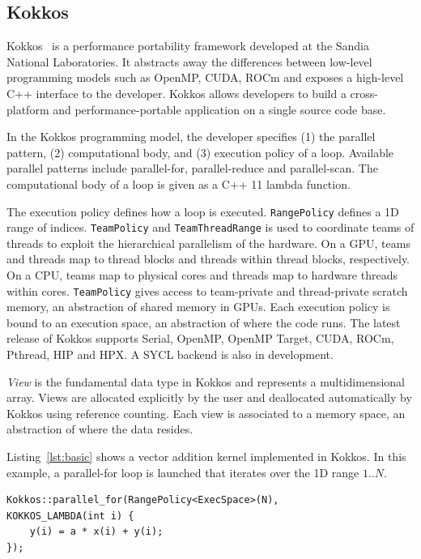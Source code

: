 \documentclass[conference]{IEEEtran}
\begin{document}
\subsection{Kokkos}

Kokkos~\cite{Edwards2014} is a performance portability framework developed at
the Sandia National Laboratories. It abstracts away the differences between
low-level programming models such as OpenMP, CUDA, ROCm and exposes a
high-level C++ interface to the developer. Kokkos allows developers to build a
cross-platform and performance-portable application on a single source code
base.

In the Kokkos programming model, the developer specifies (1) the parallel
pattern, (2) computational body, and (3) execution policy of a loop. Available
parallel patterns include parallel-for, parallel-reduce and parallel-scan. The
computational body of a loop is given as a C++ 11 lambda function.

The execution policy defines how a loop is executed. \texttt{RangePolicy}
defines a 1D range of indices. \texttt{TeamPolicy} and \texttt{TeamThreadRange}
is used to coordinate teams of threads to exploit the hierarchical parallelism
of the hardware. On a GPU, teams and threads map to thread blocks and threads
within thread blocks, respectively. On a CPU, teams map to physical cores and
threads map to hardware threads within cores. \texttt{TeamPolicy} gives access
to team-private and thread-private scratch memory, an abstraction of shared
memory in GPUs. Each execution policy is bound to an execution space, an
abstraction of where the code runs. The latest release of Kokkos supports
Serial, OpenMP, OpenMP Target, CUDA, ROCm, Pthread, HIP and HPX\@. A SYCL
backend is also in development.

\textit{View} is the fundamental data type in Kokkos and represents a
multidimensional array. Views are allocated explicitly by the user and
deallocated automatically by Kokkos using reference counting.
Each view is associated to a memory space, an abstraction of
where the data resides.

Listing~\ref{lst:basic} shows a vector addition  kernel implemented in Kokkos.
In this example, a parallel-for loop is launched that iterates over the 1D
range $1..N$.

\begin{lstlisting}[caption={Basic data parallel loop},label={lst:basic}]
Kokkos::parallel_for(RangePolicy<ExecSpace>(N),
KOKKOS_LAMBDA(int i) {
    y(i) = a * x(i) + y(i);
});
\end{lstlisting}
\end{document}
